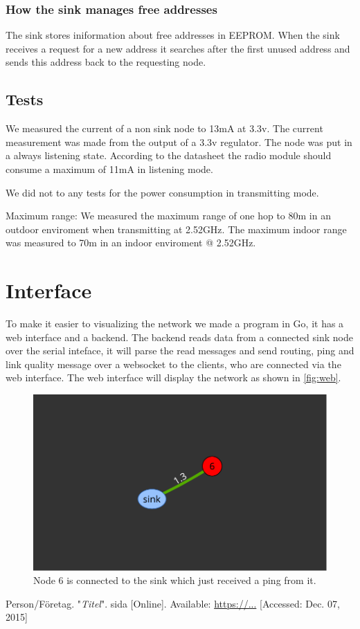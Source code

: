 \documentclass[a4paper,11pt]{article}
\begin{document}
\subsubsection{How the sink manages free addresses}
The sink stores iniformation about free addresses in EEPROM.  When the
sink receives a request for a new address it searches after the first
unused address and sends this address back to the requesting node.

\subsection{Tests}
We measured the current of a non sink node to 13mA at 3.3v. The
current measurement was made from the output of a 3.3v regulator.
The node was put in a always listening state. According to the
datasheet the radio module should consume a maximum of 11mA in
listening mode.

We did not to any tests for the power consumption in transmitting
mode.

Maximum range:
We measured the maximum range of one hop to 80m in an outdoor
enviroment when transmitting at 2.52GHz.
The maximum indoor range was measured to 70m in an indoor
enviroment @ 2.52GHz.


\section{Interface}
To make it easier to visualizing the network we made a program in Go,
it has a web interface and a backend. The backend reads data from a
connected sink node over the serial inteface, it will parse the read
messages and send routing, ping and link quality message over a
websocket to the clients, who are connected via the web interface. The
web interface will display the network as shown in \autoref{fig:web}.

\begin{figure}[H]
  \begin{center}
    \includegraphics[width=.5\textwidth]{map}
  \end{center}
  \caption{Node 6 is connected to the sink which just received a ping from it.}
  \label{fig:web}
\end{figure}

\begin{thebibliography}{2}

  Person/Företag. "\emph{Titel}". sida [Online]. Available: \url{https://...} [Accessed: Dec. 07, 2015]

\end{thebibliography}
\end{document}
